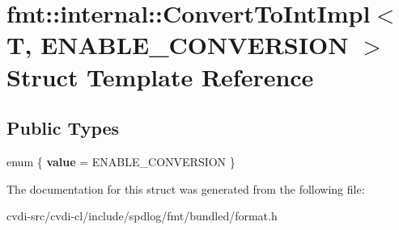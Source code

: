 \hypertarget{structfmt_1_1internal_1_1ConvertToIntImpl}{}\section{fmt\+:\+:internal\+:\+:Convert\+To\+Int\+Impl$<$ T, E\+N\+A\+B\+L\+E\+\_\+\+C\+O\+N\+V\+E\+R\+S\+I\+ON $>$ Struct Template Reference}
\label{structfmt_1_1internal_1_1ConvertToIntImpl}
\subsection*{Public Types}
\begin{DoxyCompactItemize}
\item 
enum \{ {\bfseries value} = E\+N\+A\+B\+L\+E\+\_\+\+C\+O\+N\+V\+E\+R\+S\+I\+ON
 \}\hypertarget{structfmt_1_1internal_1_1ConvertToIntImpl_a92db599c622b5ba95c46b5b93a00b39c}{}\label{structfmt_1_1internal_1_1ConvertToIntImpl_a92db599c622b5ba95c46b5b93a00b39c}

\end{DoxyCompactItemize}


The documentation for this struct was generated from the following file\+:\begin{DoxyCompactItemize}
\item 
cvdi-\/src/cvdi-\/cl/include/spdlog/fmt/bundled/format.\+h\end{DoxyCompactItemize}
